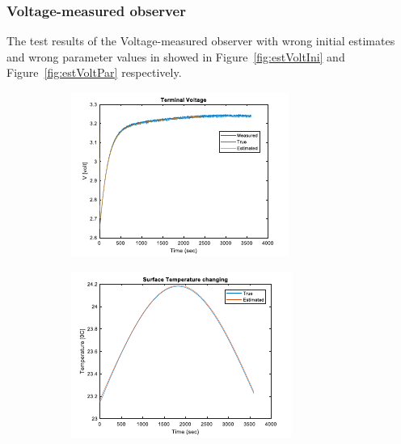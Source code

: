 \documentclass[12pt]{article}
\begin{document}
\subsubsection{Voltage-measured observer}
The test results of the Voltage-measured observer with wrong initial estimates and wrong parameter values in showed in Figure~\ref{fig:estVoltIni} and Figure~\ref{fig:estVoltPar} respectively.
\begin{figure}[H]
	\centering
	\begin{subfigure}[t]{0.3\linewidth}
		\includegraphics[width=\linewidth]{figures/estVoltIni1.pdf}
	\end{subfigure}
	\begin{subfigure}[t]{0.3\linewidth}
		\includegraphics[width=\linewidth]{figures/estVoltIni2.pdf}

\end{subfigure}
\end{figure}
\end{document}
